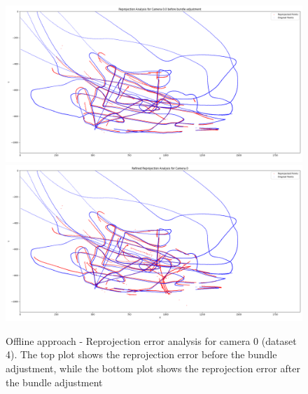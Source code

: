 \documentclass[11pt]{article}
\begin{document}
\begin{figure}[h]
    \centering
    \includegraphics[width=.9\textwidth]{../plots/dataset4/reprojection_analysis_camera_0_before_ba_.png}
    \includegraphics[width=.9\textwidth]{../plots/dataset4/reprojection_analysis_camera_0.png}
    \caption{Offline approach - Reprojection error analysis for camera 0 (dataset 4). The top plot shows the reprojection error before the bundle adjustment, while the bottom plot shows the reprojection error after the bundle adjustment}
    \label{fig:reprojection_analysis}
\end{figure}
\end{document}
